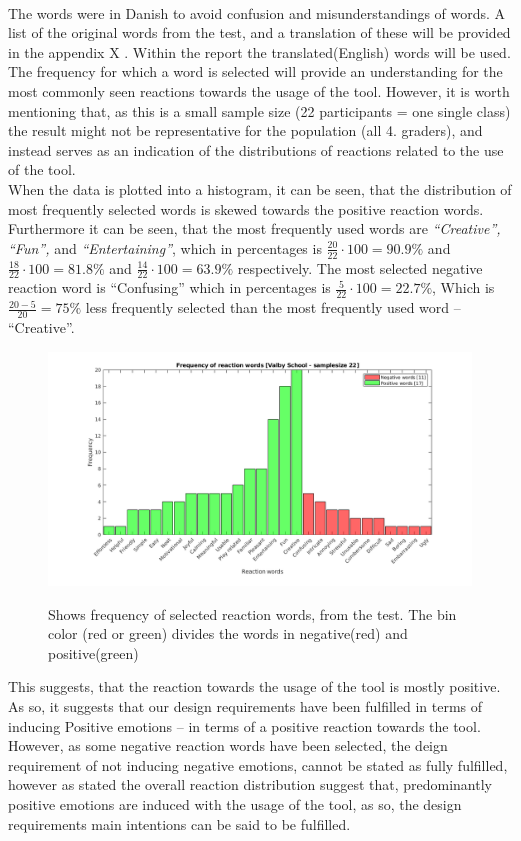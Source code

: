\newline
\\
The words were in Danish to avoid confusion and misunderstandings of words.  A list of the original words from the test, and a translation of these will be provided in the appendix X . Within the report the translated(English) words will be used. 
The frequency for which a word is selected will provide an understanding for the most commonly seen reactions towards the usage of the tool. However, it is worth mentioning that, as this is a small sample size (22 participants = one single class) the result might not be representative for the population (all 4. graders), and instead serves as an indication of the distributions of reactions related to the use of the tool. 
\newline
\\
When the data is plotted into a histogram, it can be seen, that the distribution of most frequently selected words is skewed towards the positive reaction words. Furthermore it can be seen, that the most frequently used words are  \textit{“Creative”, “Fun”,} and \textit{“Entertaining”}, which in percentages is $\frac{20}{22}\cdot100 = 90.9\%$ and $\frac{18}{22}\cdot100 = 81.8\%$ and $\frac{14}{22}\cdot100 = 63.9\%$ respectively. The most selected negative reaction word is “Confusing” which in percentages is $\frac{5}{22}\cdot100 = 22.7\%$, Which is $\frac{20-5}{20}= 75\%$ less frequently selected than the most frequently used word – “Creative”.




\begin{figure}[H]
	\centering
	\includegraphics[width=0.9\linewidth]{figure/Evaluation/histValby}
	\label{fig:valbyTest}
	\caption{Shows frequency of selected reaction words, from the test. The bin color (red or green) divides the words in negative(red) and positive(green) }
	
\end{figure}

This suggests, that the reaction towards the usage of the tool is mostly positive.  As so, it suggests that our design requirements have been fulfilled in terms of inducing Positive emotions – in terms of a positive reaction towards the tool. However, as some negative reaction words have been selected, the deign requirement of not inducing negative emotions, cannot be stated as fully fulfilled, however as stated the overall reaction distribution suggest that, predominantly positive emotions are induced with the usage of the tool, as so, the design requirements main intentions can be said to be fulfilled. 
